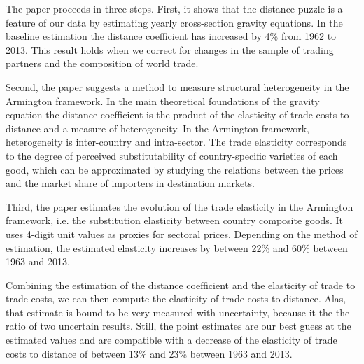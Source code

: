\documentclass[12pt,twoside,a4paper,notitlepage]{article}
\begin{document}
The paper proceeds in three steps.
First, it shows that the distance puzzle is a feature of our data by estimating yearly cross-section gravity equations.
In the baseline estimation the distance coefficient has increased by 4\% from 1962 to 2013.
This result holds when we correct for changes in the sample of trading partners and the composition of world trade.

Second, the paper suggests a method to measure structural heterogeneity in the Armington framework.
In the main theoretical foundations of the gravity equation the distance coefficient is the product of the elasticity of trade costs to distance and a measure of heterogeneity.
In the Armington framework, heterogeneity is inter-country and intra-sector.
The trade elasticity corresponds to the degree of perceived substitutability of country-specific varieties of each good, which can be approximated by studying the relations between the prices and the market share of importers in destination markets.

Third, the paper estimates the evolution of the trade elasticity in the Armington framework, i.e. the substitution elasticity between country composite goods.
It uses 4-digit unit values as proxies for sectoral prices.
Depending on the method of estimation, the estimated elasticity increases by between 22\% and 60\% between 1963 and 2013.

Combining the estimation of the distance coefficient and the elasticity of trade to trade costs, we can then compute the elasticity of trade costs to distance. Alas, that estimate is bound to be very measured with uncertainty, because it the the ratio of two uncertain results. Still, the point estimates are our best guess at the estimated values and are compatible with a decrease of the elasticity of trade costs to distance of between 13\% and 23\% between 1963 and 2013.
\end{document}

